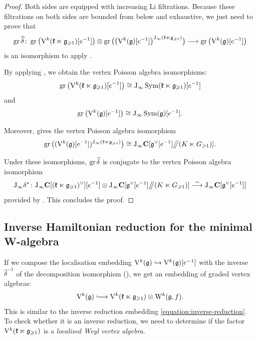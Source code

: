 \begin{proof}	
	Both sides are equipped with increasing Li filtrations. Because these filtrations on both sides are bounded from below and exhaustive, we just need to prove that
	\[ \operatorname{gr} \widehat\delta \colon \operatorname{gr} \big(\mathrm V^k(\mathfrak k \ltimes \mathfrak g_{\geqslant 1})[e^{-1}]\big) \otimes \operatorname{gr}\big(\big(\mathrm V^k(\mathfrak g)[e^{-1}]\big)^{\mathrm{J}_\infty(\mathfrak k \ltimes \mathfrak g_{\geqslant 1})}\big) \longrightarrow \operatorname{gr} \big(\mathrm V^k(\mathfrak g)[e^{-1}]\big) \]
	is an isomorphism to apply .
	
	By applying , we obtain the vertex Poisson algebra isomorphisms:
	\[ \operatorname{gr}\big(\mathrm V^k(\mathfrak k \ltimes \mathfrak g_{\geqslant 1})[e^{-1}]\big) \cong \mathrm{J}_\infty\operatorname{Sym}(\mathfrak k \ltimes \mathfrak g_{\geqslant 1})[e^{-1}]  \]
	and 
	\[ \operatorname{gr}\big(\mathrm V^k(\mathfrak g)[e^{-1}]\big) \cong \mathrm{J}_\infty \operatorname{Sym}(\mathfrak g)[e^{-1}]. \]
	
	Moreover,  gives the vertex Poisson algebra isomorphism
	\[ \operatorname{gr}\big((\mathrm V^k(\mathfrak g)[e^{-1}])^{\mathrm{J}_\infty(\mathfrak k \ltimes \mathfrak g_{\geqslant 1})}\big) \cong \mathrm{J}_\infty\mathbf{C}[\mathfrak g^\vee[e^{-1}] \big/\!\!\big/(K \ltimes G_{\geqslant 1})].  \]
	
	Under these isomorphisms, $\operatorname{gr} \widehat{\delta}$ is conjugate to the vertex Poisson algebra isomorphism 
	\[ \mathrm{J}_\infty\delta^* \colon \mathrm{J}_\infty \mathbf{C}[(\mathfrak k \ltimes \mathfrak g_{\geqslant 1})^\vee][e^{-1}] \otimes \mathrm{J}_\infty\mathbf{C}[\mathfrak g^\vee[e^{-1}] \big/\!\!\big/ (K \ltimes G_{\geqslant 1})]  \overset{\sim}{\longrightarrow} \mathrm{J}_\infty \mathbf{C}[\mathfrak g^\vee[e^{-1}]]  \]
	provided by . This concludes the proof.
\end{proof}

\subsection{Inverse Hamiltonian reduction for the minimal W-algebra}

If we compose the localisation embedding $\mathrm V^k(\mathfrak g) \hookrightarrow \mathrm V^k(\mathfrak g)[e^{-1}]$ with the inverse $\widehat{\delta}^{-1}$ of the decomposition isomorphism (), we get an embedding of graded vertex algebras:
\[ \V^k(\g) \hooklongrightarrow \V^k(\kfk \ltimes \g_{\geqslant 1}) \otimes \W^k(\g, f). \]
This is similar to the inverse reduction embedding \eqref{equation:inverse-reduction}. To check whether it is an inverse reduction, we need to determine if the factor $\mathrm V^k(\mathfrak k \ltimes \mathfrak g_{\geqslant 1})$ is a \emph{localised Weyl vertex algebra}. 

